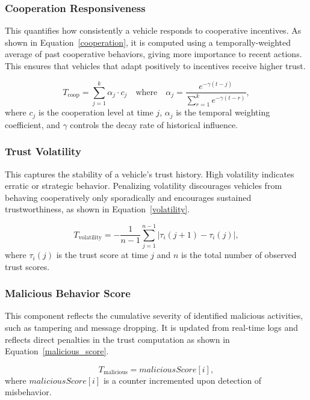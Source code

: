\cite{cho2010survey}\documentclass[journal,comsoc,twoside]{IEEEtran}
\begin{document}
\subsubsection{Cooperation Responsiveness}
This quantifies how consistently a vehicle responds to cooperative incentives. As shown in Equation~\ref{cooperation}, it is computed using a temporally-weighted average of past cooperative behaviors, giving more importance to recent actions. This ensures that vehicles that adapt positively to incentives receive higher trust.

\begin{equation}
\label{cooperation}
T_{\text{coop}} = \sum_{j=1}^{k} \alpha_j \cdot c_j \quad \text{where} \quad \alpha_j = \frac{e^{-\gamma (t-j)}}{\sum_{r=1}^{k} e^{-\gamma (t-r)}},
\end{equation}
where $c_j$ is the cooperation level at time $j$, $\alpha_j$ is the temporal weighting coefficient, and $\gamma$ controls the decay rate of historical influence.

\subsubsection{Trust Volatility}
This captures the stability of a vehicle’s trust history. High volatility indicates erratic or strategic behavior. Penalizing volatility discourages vehicles from behaving cooperatively only sporadically and encourages sustained trustworthiness, as shown in Equation~\ref{volatility}.

\begin{equation}
\label{volatility}
T_{\text{volatility}} = -\frac{1}{n-1} \sum_{j=1}^{n-1} |\tau_i(j+1) - \tau_i(j)|,
\end{equation}
where $\tau_i(j)$ is the trust score at time $j$ and $n$ is the total number of observed trust scores.

\subsubsection{Malicious Behavior Score}
This component reflects the cumulative severity of identified malicious activities, such as tampering and message dropping. It is updated from real-time logs and reflects direct penalties in the trust computation as shown in Equation~\ref{malicious_score}.

\begin{equation}
\label{malicious_score}
T_{\text{malicious}} = \textit{maliciousScore}[i],
\end{equation}
where $\textit{maliciousScore}[i]$ is a counter incremented upon detection of misbehavior.
\end{document}
